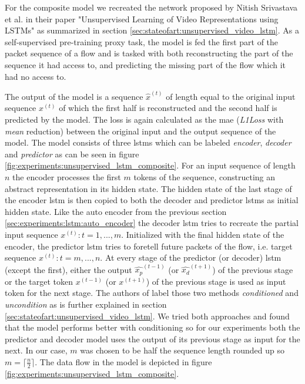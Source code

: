 For the composite model we recreated the network proposed by Nitish Srivastava et al. in their paper "Unsupervised Learning of Video Representations using LSTMs" \cite{unsupervised_learning_lstms} as summarized in section \ref{sec:stateofart:unsupervised_video_lstm}. As a self-supervised pre-training proxy task, the model is fed the first part of the packet sequence of a flow and is tasked with both reconstructing the part of the sequence it had access to, and predicting the missing part of the flow which it had no access to. \par
The output of the model is a sequence $\hat{x}^{(t)}$ of length equal to the original input sequence $x^{(t)}$ of which the first half is reconstructed and the second half is predicted by the model. The loss is again calculated as the \gls{mae} (\textit{L1Loss} with \textit{mean} reduction) between the original input and the output sequence of the model. The model consists of three \glspl{lstm} which can be labeled \textit{encoder}, \textit{decoder} and \textit{predictor} as can be seen in figure \ref{fig:experiments:unsupervised_lstm_composite}. For an input sequence of length $n$ the encoder processes the first $m$ tokens of the sequence, constructing an abstract representation in its hidden state. The hidden state of the last stage of the encoder \gls{lstm} is then copied to both the decoder and predictor \glspl{lstm} as initial hidden state. Like the auto encoder from the previous section \ref{sec:experiments:lstm:auto_encoder} the decoder \gls{lstm} tries to recreate the partial input sequence $x^{(t)}: t=1, ..., m$. Initialized with the final hidden state of the encoder, the predictor \gls{lstm} tries to foretell future packets of the flow, i.e. target sequence $x^{(t)}: t=m, ..., n$. At every stage of the predictor (or decoder) \gls{lstm} (except the first), either the output $\hat{x_p}^{(t-1)}$ (or $\hat{x_d}^{(t+1)}$) of the previous stage or the target token $x^{(t-1)}$ (or $x^{(t+1)}$) of the previous stage is used as input token for the next stage. The authors of \cite{unsupervised_learning_lstms} label those two methods \textit{conditioned} and \textit{uncondition} as is further explained in section \ref{sec:stateofart:unsupervised_video_lstm}. We tried both approaches and found that the model performs better with conditioning so for our experiments both the predictor and decoder model uses the output of its previous stage as input for the next. In our case, $m$ was chosen to be half the sequence length rounded up so $m=\lceil \frac{n}{2} \rceil$. The data flow in the model is depicted in figure \ref{fig:experiments:unsupervised_lstm_composite}. 

